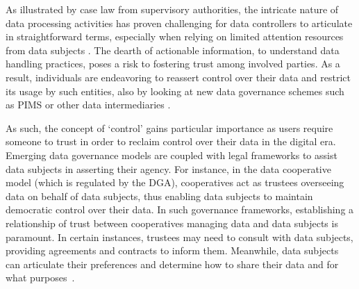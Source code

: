 As illustrated by case law from supervisory authorities, the intricate nature of data processing activities has proven challenging for data controllers to articulate in straightforward terms, especially when relying on limited attention resources from data subjects \citep{european_data_protection_board_guidelines_2020}.
The dearth of actionable information, to understand data handling practices, poses a risk to fostering trust among involved parties.
As a result, individuals are endeavoring to reassert control over their data and restrict its usage by such entities, also by looking at new data governance schemes such as PIMS or other data intermediaries \citep{craglia_digitranscope_2021,papagiannakopoulou_leveraging_2014}. 

As such, the concept of `control' gains particular importance as users require someone to trust in order to reclaim control over their data in the digital era.
Emerging data governance models are coupled with legal frameworks to assist data subjects in asserting their agency.
For instance, in the data cooperative model (which is regulated by the DGA), cooperatives act as trustees overseeing data on behalf of data subjects, thus enabling data subjects to maintain democratic control over their data. 
In such governance frameworks, establishing a relationship of trust between cooperatives managing data and data subjects is paramount.
In certain instances, trustees may need to consult with data subjects, providing agreements and contracts to inform them. 
Meanwhile, data subjects can articulate their preferences and determine how to share their data and for what purposes~\citep{craglia_digitranscope_2021}.

